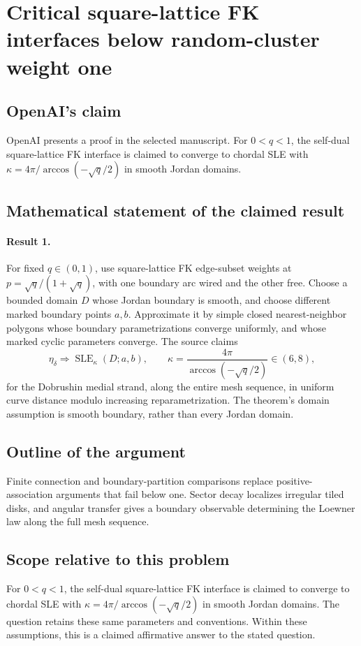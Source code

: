 \documentclass[11pt]{article}
\begin{document}
\section*{Critical square-lattice FK interfaces below random-cluster weight one}

\subsection{OpenAI's claim}
OpenAI presents a proof in the selected manuscript. For $0<q<1$, the self-dual square-lattice FK interface is claimed to converge to chordal SLE with $\kappa=4\pi/\arccos(-\sqrt q/2)$ in smooth Jordan domains.

\subsection{Mathematical statement of the claimed result}
\paragraph{Result 1.} For fixed \(q\in(0,1)\), use square-lattice FK edge-subset weights at \(p=\sqrt q/(1+\sqrt q)\), with one boundary arc wired and the other free. Choose a bounded domain \(D\) whose Jordan boundary is smooth, and choose different marked boundary points \(a,b\). Approximate it by simple closed nearest-neighbor polygons whose boundary parametrizations converge uniformly, and whose marked cyclic parameters converge. The source claims
\[
 \eta_\delta\Longrightarrow\operatorname{SLE}_\kappa(D;a,b),\qquad
 \kappa=\frac{4\pi}{\arccos(-\sqrt q/2)}\in(6,8),
\]
for the Dobrushin medial strand, along the entire mesh sequence, in uniform curve distance modulo increasing reparametrization. The theorem's domain assumption is smooth boundary, rather than every Jordan domain.

\subsection{Outline of the argument}
Finite connection and boundary-partition comparisons replace positive-association arguments that fail below one. Sector decay localizes irregular tiled disks, and angular transfer gives a boundary observable determining the Loewner law along the full mesh sequence.

\subsection{Scope relative to this problem}
For $0<q<1$, the self-dual square-lattice FK interface is claimed to converge to chordal SLE with $\kappa=4\pi/\arccos(-\sqrt q/2)$ in smooth Jordan domains. The question retains these same parameters and conventions. Within these assumptions, this is a claimed affirmative answer to the stated question.
\end{document}
